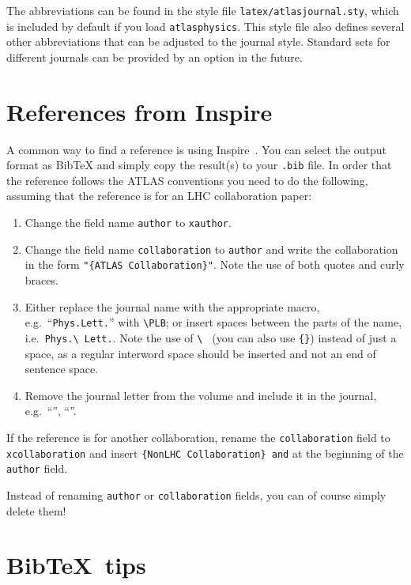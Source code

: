 \documentclass[UKenglish]{latex/atlasdoc}
\newcommand*{\BibTeX}{Bib\TeX}
\newcommand{\File}[1]{\texttt{#1}\xspace}
\newcommand{\Package}[1]{\texttt{#1}\xspace}
\begin{document}
The abbreviations can be found in the style file \File{latex/atlasjournal.sty},
which is included by default if you load \Package{atlasphysics}.
This style file also defines several other abbreviations that can be adjusted to the
journal style. 
Standard sets for different journals can be provided by an option in the future.

\section{References from Inspire}
\label{sc:inquire}

A common way to find a reference is using Inspire~\cite{inspire}.
You can select the output format as BibTeX and simply copy the result(s) to your \File{.bib} file.
In order that the reference follows the ATLAS conventions you need to do the following,
assuming that the reference is for an LHC collaboration paper:
\begin{enumerate}
\item Change the field name \texttt{author} to \texttt{xauthor}.
\item Change the field name \texttt{collaboration} to \texttt{author} and write the collaboration in the form
  \verb|"{ATLAS Collaboration}"|. Note the use of both quotes and curly braces.
\item Either replace the journal name with the appropriate macro, e.g.\ ``\texttt{Phys.Lett.}'' with
  \verb|\PLB|; or insert spaces between the parts of the name, i.e.\ \verb|Phys.\ Lett.|.
  Note the use of \verb|\ | (you can also use \verb|{}|) instead of just a space, 
  as a regular interword space should be inserted and not an end of sentence space.
\item Remove the journal letter from the volume and include it in the journal, e.g.\ ``\EPJC'', ``\PRD''. 
\end{enumerate}
If the reference is for another collaboration, rename the \texttt{collaboration} field to
\texttt{xcollaboration} and insert \verb|{NonLHC Collaboration} and| at the beginning of the 
\texttt{author} field.

Instead of renaming \texttt{author} or \texttt{collaboration} fields, you can of course simply delete them!


\section{\BibTeX\ tips}
\end{document}
